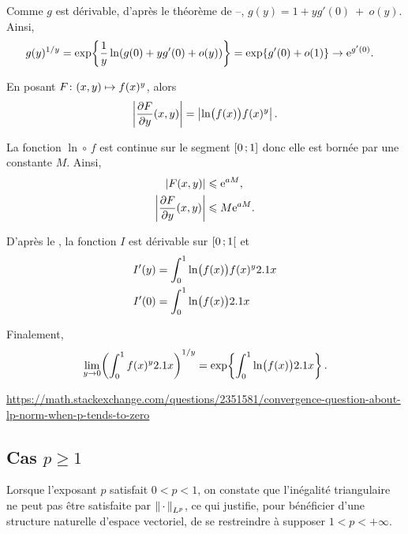 \begin{solution}
\begin{reponses}
\item Comme $g$ est dérivable, d'après le théorème de --, $g(y) = 1 + y g'(0)~+~o(y)$. Ainsi,
\begin{align*}
g(y)^{1/y} &= \exp\mathopen{}\left\{\frac{1}{y} \ln(g(0) + y g'(0) + o(y))\right\}
= \exp\mathopen{}\left\{g'(0) + o(1)\right\}
\to \e^{g'(0)}.
\end{align*}

\item En posant $\fonctionligne[F]{(x, y)}{f(x)^y}$, alors
\[
\module{\frac{\partial F}{\partial y}(x, y)} = \module{\ln\mathopen{}\big(f(x)\big) f(x)^y}.
\]

La fonction $\ln \circ\, f$ est continue sur le segment $\interff{0}{1}$ donc elle est bornée par une constante $M$. Ainsi,
\begin{align*}
\module{F(x, y)} &\leqslant \e^{a M},\\
\module{\frac{\partial F}{\partial y}(x, y)} &\leqslant M \e^{a M}.
\end{align*}

D'après le , la fonction $I$ est dérivable sur $\interfo{0}{1}$ et
\begin{align*}
I'(y) &= \int_0^1 \ln\mathopen{}\big(f(x)\big) f(x)^y \d x \\
I'(0) &= \int_0^1 \ln\mathopen{}\big(f(x)\big) \d x
\end{align*}

\item Finalement,
\[
\lim_{y\to0} \mathopen{}\left(\int_0^1 f(x)^y \d x\right)^{1/y} = \exp\mathopen{}\left\{\int_0^1 \ln\mathopen{}\big(f(x)\big) \d x\right\}.
\]
\end{reponses}
\end{solution}

\url{https://math.stackexchange.com/questions/2351581/convergence-question-about-lp-norm-when-p-tends-to-zero}


\subsection{Cas $p \geqslant 1$}

Lorsque l'exposant $p$ satisfait $0 < p < 1$, on constate que l'inégalité triangulaire ne peut pas être satisfaite par $\norm{\,\cdot\,}_{L^p}$, ce qui justifie, pour bénéficier d’une structure naturelle d’espace vectoriel, de se restreindre à supposer $1 < p < +\infty$.

